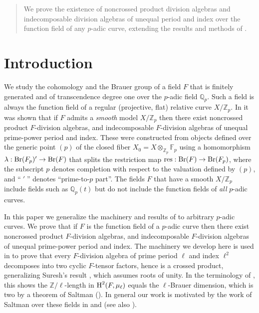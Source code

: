 \documentclass{amsart}
\theoremstyle{plain}
\theoremstyle{definition}
\theoremstyle{remark}
\numberwithin{equation}{section}%
\newcommand{\F}{{\mathbb F}}
\renewcommand{\H}{{\text{\rm H}}}
\newcommand{\Q}{{\mathbb Q}}
\newcommand{\Z}{{\mathbb Z}}
\newcommand{\res}{{\text{\rm res}}}
\newcommand{\Br}{{\text{\rm Br}}}
\begin{document}
\begin{abstract}
We prove the existence of noncrossed product division algebras and indecomposable
division algebras of unequal period and index over the function field of any $p$-adic
curve, extending the results and methods of \cite{BMT}.
\end{abstract}

\maketitle

\section{Introduction}

We study the cohomology and the Brauer group of a field $F$ that is finitely generated
and of transcendence degree one over the $p$-adic field $\Q_p$.
Such a field is always the function field of a regular (projective, flat) relative curve $X/\Z_p$.
In \cite{BMT} it was shown that if $F$ admits a {\it smooth} model
$X/\Z_p$ then there exist noncrossed product $F$-division algebras,
and indecomposable $F$-division algebras of unequal prime-power period and index.
These were constructed from objects defined over the generic point $(p)$ of the closed
fiber $X_0=X\otimes_{\Z_p}\F_p$ using a
homomorphism $\lambda:\Br(F_p)'\to\Br(F)$ that splits the restriction map
$\res:\Br(F)\to\Br(F_p)$, where the subscript $p$ denotes completion with respect to 
the valuation defined by $(p)$, and ``$\;'\;$'' denotes ``prime-to-$p$ part''. 
The fields $F$ that have a smooth $X/\Z_p$ include fields such as $\Q_p(t)$ 
but do not include the function
fields of {\it all} $p$-adic curves.

In this paper we generalize the machinery and results of \cite{BMT} to arbitrary $p$-adic curves.
We prove that if $F$ is the function field of a $p$-adic curve then there exist
noncrossed product $F$-division algebras, and indecomposable $F$-division algebras
of unequal prime-power period and index.  The machinery we develop here is used in \cite{BT11b}
to prove that every $F$-division algebra of prime period $\ell$ and index $\ell^2$ decomposes 
into two cyclic $F$-tensor factors, 
hence is a crossed product, generalizing Suresh's result \cite{Sur10},
which assumes roots of unity.  
In the terminology of \cite[Sections 3,4]{ABGV},
this shows the $\Z/\ell$-length in $\H^2(F,\mu_\ell)$ equals the $\ell$-Brauer dimension,
which is two by a theorem of Saltman (\cite[Theorem 3.4]{Sa97}).
In general our work is motivated by the work of Saltman over these fields in \cite{Sa97} and \cite{Sa07}
(see also \cite{Br10}).
\end{document}
